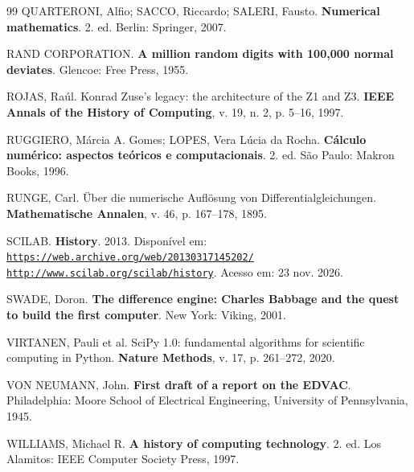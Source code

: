 \begin{thebibliography}{99}
QUARTERONI, Alfio; SACCO, Riccardo; SALERI, Fausto. \textbf{Numerical mathematics}. 2. ed. Berlin: Springer, 2007.

RAND CORPORATION. \textbf{A million random digits with 100,000 normal deviates}. Glencoe: Free Press, 1955.

ROJAS, Raúl. Konrad Zuse's legacy: the architecture of the Z1 and Z3. \textbf{IEEE Annals of the History of Computing}, v. 19, n. 2, p. 5--16, 1997.

RUGGIERO, Márcia A. Gomes; LOPES, Vera Lúcia da Rocha. \textbf{Cálculo numérico: aspectos teóricos e computacionais}. 2. ed. São Paulo: Makron Books, 1996.

RUNGE, Carl. Über die numerische Auflösung von Differentialgleichungen. \textbf{Mathematische Annalen}, v. 46, p. 167--178, 1895.

SCILAB. \textbf{History}. 2013. Disponível em: \href{https://web.archive.org/web/20130317145202/http://www.scilab.org/scilab/history}{\nolinkurl{https://web.archive.org/web/20130317145202/} \nolinkurl{http://www.scilab.org/scilab/history}}. Acesso em: 23 nov. 2026.

SWADE, Doron. \textbf{The difference engine: Charles Babbage and the quest to build the first computer}. New York: Viking, 2001.

VIRTANEN, Pauli et al. SciPy 1.0: fundamental algorithms for scientific computing in Python. \textbf{Nature Methods}, v. 17, p. 261--272, 2020.

VON NEUMANN, John. \textbf{First draft of a report on the EDVAC}. Philadelphia: Moore School of Electrical Engineering, University of Pennsylvania, 1945.

WILLIAMS, Michael R. \textbf{A history of computing technology}. 2. ed. Los Alamitos: IEEE Computer Society Press, 1997.

\end{thebibliography}
